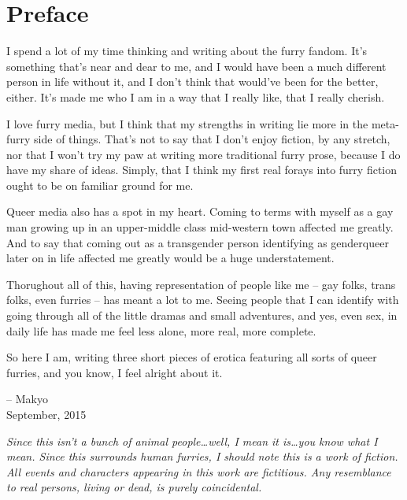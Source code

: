 \chapter*{Preface}

I spend a lot of my time thinking and writing about the furry fandom.  It's something that's near and dear to me, and I would have been a much different person in life without it, and I don't think that would've been for the better, either.  It's made me who I am in a way that I really like, that I really cherish.

I love furry media, but I think that my strengths in writing lie more in the meta-furry side of things.  That's not to say that I don't enjoy fiction, by any stretch, nor that I won't try my paw at writing more traditional furry prose, because I do have my share of ideas.  Simply, that I think my first real forays into furry fiction ought to be on familiar ground for me.

Queer media also has a spot in my heart.  Coming to terms with myself as a gay man growing up in an upper-middle class mid-western town affected me greatly. And to say that coming out as a transgender person identifying as genderqueer later on in life affected me greatly would be a huge understatement.

Thorughout all of this, having representation of people like me -- gay folks, trans folks, even furries -- has meant a lot to me.  Seeing people that I can identify with going through all of the little dramas and small adventures, and yes, even sex, in daily life has made me feel less alone, more real, more complete.

So here I am, writing three short pieces of erotica featuring all sorts of queer furries, and you know, I feel alright about it.

-- Makyo\\September, 2015

\newpage
\textit{Since this isn't a bunch of animal people\ldots{}well, I mean it is\ldots{}you know what I mean.  Since this surrounds human furries, I should note this is a work of fiction. All events and characters appearing in this work are fictitious. Any resemblance to real persons, living or dead, is purely coincidental.}
